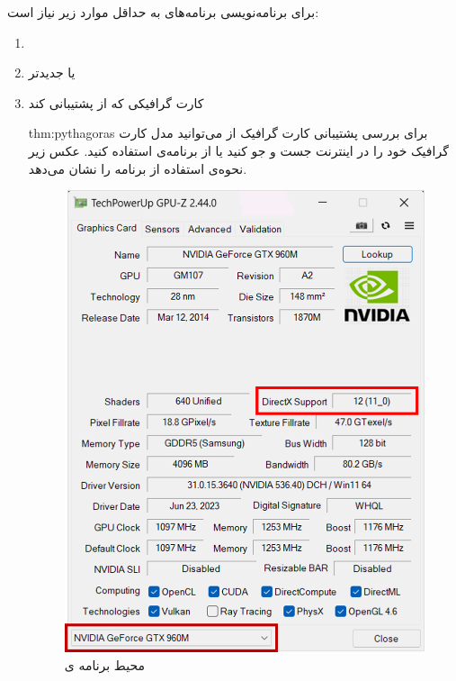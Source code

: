 {
    \Large
    برای برنامه‌نویسی برنامه‌های  به حداقل موارد زیر نیاز است:
    \begin{enumerate}
        \item {}
        \item { یا جدیدتر}
        \item {کارت گرافیکی که از  پشتیبانی کند
            \begin{point}{thm:pythagoras}
                \Large
                برای بررسی پشتیبانی کارت گرافیک از  می‌توانید مدل کارت گرافیک خود را در اینترنت جست و جو کنید یا از برنامه‌ی  استفاده کنید. عکس زیر نحوه‌ی استفاده از برنامه را نشان می‌دهد.

                \begin{figure}[H]
                    \centering
                    \setlength{\belowcaptionskip}{-10pt}
                    \includegraphics[scale=0.50]{Images/3/3.Intro.0.1}
                    \caption*{\Large محیط برنامه ی  \textbf{\vspace{12pt}}}
                \end{figure}
            \end{point}
        }
    \end{enumerate}
}

